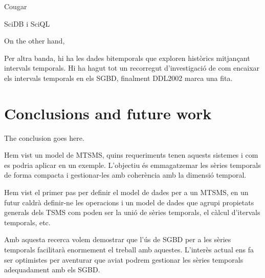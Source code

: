 \documentclass{scrartcl}
\begin{document}
Cougar \cite{fung2}



SciDB i SciQL




On the other hand,

Per altra banda, hi ha les dades bitemporals que exploren històrics mitjançant intervals temporals. Hi ha hagut tot un recorregut d'investigació de com encaixar  els intervals temporals en els SGBD, finalment DDL2002 marca una fita.



\section{Conclusions and future work} 
The conclusion goes here.

Hem vist un model de MTSMS, quins requeriments tenen aquests sistemes i com es podria aplicar en un exemple. L'objectiu és emmagatzemar les sèries temporals de forma compacta i gestionar-les amb coherència amb la dimensió temporal. 

Hem vist el primer pas per definir el model de dades per a un MTSMS, en un futur caldrà definir-ne les operacions i un model de dades que agrupi propietats generals dels TSMS com poden ser la unió de sèries temporals, el càlcul d'itervals temporals, etc.

Amb aquesta recerca volem demostrar que l'ús de SGBD per a les sèries temporals facilitarà enormement el treball amb aquestes.
L'interès actual ens fa ser optimistes per aventurar que aviat podrem gestionar les sèries temporals adequadament amb els SGBD.
\end{document}
